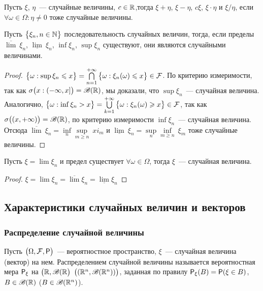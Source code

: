 \begin{consequence}
	Пусть $\xi$, $\eta$~--- случайные величины, $c \in \R$,тогда $\xi + \eta$, $\xi - \eta$, $c\xi$, $\xi \cdot \eta$ и $\xi / \eta$, если $\forall \omega \in \Omega : \eta \neq 0$ тоже случайные величины.
\end{consequence}
\begin{lemma}
	Пусть $\big\{ \xi_n, n \in \N \big\}$ последовательность случайных величин, тогда, если пределы $\overline{\lim}~\xi_n$, $\underline{\lim}~\xi_n$, $\inf\xi_n$, $\sup\xi_n$ существуют, они являются случайными величинами.
	\begin{proof}
		$\big\{\omega : \sup \xi_n \leqslant x \big\} = \bigcap\limits_{n = 1}^{+\infty}\big\{\omega : \xi_n(\omega) \leqslant x \big\} \in \F$. По критерию измеримости, так как $\sigma\big(x : (-\infty, x]\big) = \B(\R)$, мы доказали, что $\sup\xi_n$~--- случайная величина. Аналогично, $\big\{\omega : \inf \xi_n > x \big\} = \bigcup\limits_{k = 1}^{+\infty}\big\{\omega : \xi_n(\omega) \geqslant x \big\} \in \F$, так как $\sigma\big((x, +\infty)\big) = \B(\R)$, по критерию измеримости $\inf\xi_n$~--- случайная величина. Отсюда $\overline{\lim}~\xi_n = \inf\limits_n\sup\limits_{m \geqslant n}~xi_m$ и $\underline{\lim}~\xi_n = \sup\limits_n\inf\limits_{m \geqslant n}~\xi_m$ тоже случайные величины.
	\end{proof}
\end{lemma}
\begin{consequence}
	Пусть $\xi = \lim \xi_n$ и предел существует $\forall \omega \in \Omega$, тогда $\xi$~--- случайная величина.
	\begin{proof}
	$\xi = \lim \xi_n = \overline{\lim}\xi_n = \underline{\lim} \xi_n$
	\end{proof}
\end{consequence}
\subsection{Характеристики случайных величин и векторов}
\subsubsection*{ Распределение случайной величины}
\begin{definition}
	Пусть $\big(\Omega, \F, \P \big)$~--- вероятностное пространство, $\xi$~--- случайная величина (вектор) на нем. Распределением случайной величины называется вероятностная мера $\P_\xi$ на $\big(\R, \B(\R\big)$ $\big((\R^n, \B(\R^n))\big)$, заданная по правилу $\P_\xi(B) = \P(\xi \in B)$, $B \in \B(\R)$ ($B \in \B(\R^n)$).
\end{definition}
